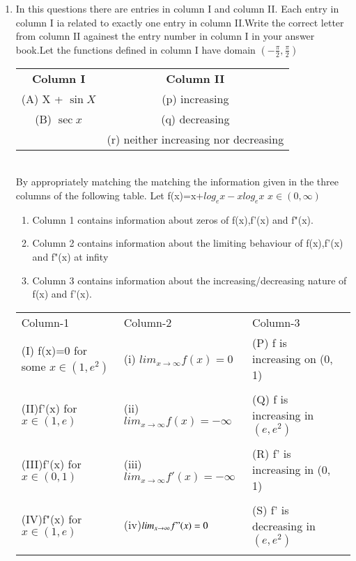 \begin{enumerate}[label=\arabic*.,ref=\thesubsection.\theenumi]
\item In this questions there are entries in column I and column II. Each entry in column I ia related to exactly one entry in column II.Write the correct letter from column II againest the entry number in column I  in your answer book.Let the functions defined in column I have domain $(-\frac{\pi}{2},\frac{\pi}{2})$
\begin{table}[ht!]
\centering
\begin{tabular}{c c} 
 \textbf{Column I} & \textbf{Column II}\\ [0.5ex] 
 (A) X + $\sin X$                                            &(p) increasing\\
 (B) $\sec x$                                                &(q) decreasing\\
                                                            &(r) neither increasing nor decreasing\\
\end{tabular}
\end{table}\\
By appropriately matching the matching the information given in the three columns of the following table.
Let f(x)=x+$log_ex-xlog_ex$ $x \in (0,\infty)$
\begin{enumerate}
    \item Column 1 contains information about zeros of f(x),f'(x) and f"(x).
    \item Column 2 contains information about the limiting behaviour of f(x),f'(x) and f"(x) at infity
    \item Column 3 contains information about the increasing/decreasing nature of f(x) and f'(x).
\end{enumerate}

\begin{center}
\begin{tabular}{llll}
Column-1 & Column-2 & Column-3\\
(I) f(x)=0 for some $x \in (1, e^2)$   &(i) $lim_{x \to \infty}f(x)=0$         &(P) f is increasing on (0, 1)\\
&&&\\
(II)f'(x) for $x \in (1, e)$           &(ii)$lim_{x \to \infty}f(x)=-\infty$   &(Q) f is increasing in $(e, e^2)$\\
&&&\\
(III)f'(x) for $x \in(0, 1)$           &(iii)$lim_{x \to \infty}f'(x)=-\infty$ &(R) f' is increasing in (0, 1)\\
&&&\\
(IV)f"(x) for $x \in (1, e)$           &(iv)$lim_{x \to \infty}f"(x)=0$        &(S) f' is decreasing in $(e, e^2)$\\
&&&\\
\end{tabular}
\end{center}


\end{enumerate}
